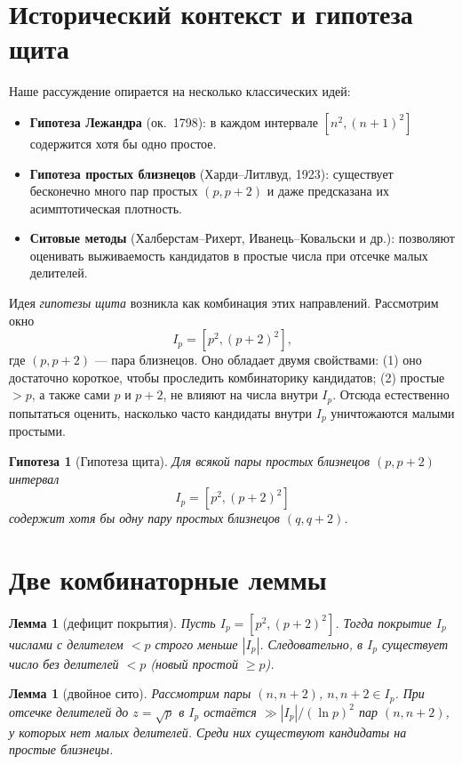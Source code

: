 \documentclass[12pt,a4paper]{article}
\theoremstyle{definition}
\theoremstyle{plain}
\newtheorem{lemma}[definition]{Лемма}
\newtheorem{hypothesis}[definition]{Гипотеза}
\theoremstyle{remark}
\begin{document}
\section{Исторический контекст и гипотеза щита}

Наше рассуждение опирается на несколько классических идей:

\begin{itemize}
  \item \textbf{Гипотеза Лежандра} (ок.~1798): в каждом интервале $[n^2,(n+1)^2]$ содержится хотя бы одно простое.
  \item \textbf{Гипотеза простых близнецов} (Харди–Литлвуд, 1923): существует бесконечно много пар простых $(p,p+2)$ и даже предсказана их асимптотическая плотность.
  \item \textbf{Ситовые методы} (Халберстам–Рихерт, Иванець–Ковальски и др.): позволяют оценивать выживаемость кандидатов в простые числа при отсечке малых делителей.
\end{itemize}

Идея \emph{гипотезы щита} возникла как комбинация этих направлений. 
Рассмотрим окно
\[
  I_p = [p^2,(p+2)^2],
\]
где $(p,p+2)$ — пара близнецов. Оно обладает двумя свойствами:
(1) оно достаточно короткое, чтобы проследить комбинаторику кандидатов; 
(2) простые $>p$, а также сами $p$ и $p+2$, не влияют на числа внутри $I_p$. 
Отсюда естественно попытаться оценить, насколько часто кандидаты внутри $I_p$ уничтожаются малыми простыми. 

\begin{hypothesis}[Гипотеза щита]
Для всякой пары простых близнецов $(p,p+2)$ интервал
\[
I_p=[p^2,(p+2)^2]
\]
содержит хотя бы одну пару простых близнецов $(q,q+2)$.
\end{hypothesis}

\section{Две комбинаторные леммы}

\begin{lemma}[дефицит покрытия]
Пусть $I_p=[p^2,(p+2)^2]$. Тогда покрытие $I_p$ числами с делителем $<p$ строго меньше $|I_p|$. 
Следовательно, в $I_p$ существует число без делителей $<p$ (новый простой $\ge p$).
\end{lemma}

\begin{lemma}[двойное сито]\label{lem:double-sieve}
Рассмотрим пары $(n,n+2)$, $n,n+2\in I_p$. 
При отсечке делителей до $z=\sqrt p$ в $I_p$ остаётся $\gg |I_p|/(\ln p)^2$ пар $(n,n+2)$, у которых нет малых делителей. 
Среди них существуют кандидаты на простые близнецы.
\end{lemma}
\end{document}
